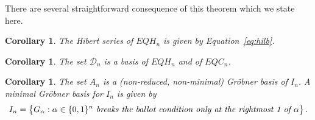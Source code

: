 \documentclass[submission]{FPSAC2023}
\newtheorem{cor}[theorem]{Corollary}
\theoremstyle{definition}
\numberwithin{equation}{section}
\begin{document}
There are several straightforward consequence of this theorem which we state here.

\begin{cor}\label{cor:hilb}  The Hibert series of $EQH_{n}$ is given by Equation~\eqref{eq:hilb}.
\end{cor}

\begin{cor} The set ${\mathcal D}_n$ is a basis of $EQH_n$ and of $EQC_n$.
\end{cor}

\begin{cor}\label{cor:minimalGB}
The set $A_n$ is a (non-reduced, non-minimal) Gr\"obner basis of $I_n$. A minimal Gr\"obner basis for $I_n$ is given by
$$ I_n =\big\{ G_\alpha : \alpha \in \{0,1\}^n \text{ \it breaks the ballot condition only
at the rightmost  1 of }  \alpha\big\}\,.
$$
\end{cor}

\printbibliography 
\end{document}
